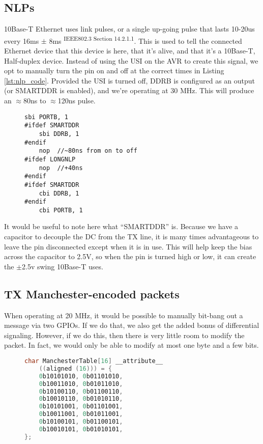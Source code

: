 \documentclass[13pt]{ltxdoc}
\begin{document}
\subsection{NLPs}
10Base-T Ethernet uses link pulses, or a single up-going pulse that lasts 10-20us
every 16ms $\pm$ 8ms \textsuperscript{IEEE802.3 Section 14.2.1.1}.  This is used to tell
the connected Ethernet device that this device is here, that it's alive, and that it's a
10Base-T, Half-duplex device.  Instead of using the USI on the AVR to create this
signal, we opt to manually turn the pin on and off at the correct times in
Listing \ref{lst:nlp_code}.  Provided the USI is turned off, DDRB is configured as
an output (or SMARTDDR is enabled), and we're operating at 30 MHz.  This will produce an $\approx$80ns to $\approx$120ns pulse.

\begin{figure}
\begin{lstlisting}[caption=NLP Code\label{lst:nlp_code}, frame=single]
	sbi PORTB, 1
#ifdef SMARTDDR
	sbi DDRB, 1
#endif
	nop  //~80ns from on to off
#ifdef LONGNLP 
	nop  //+40ns
#endif
#ifdef SMARTDDR
	cbi DDRB, 1
#endif
	cbi PORTB, 1
\end{lstlisting}
\end{figure}

It would be useful to note here what ``SMARTDDR'' is.  Because we have a capacitor to decouple the DC from the TX line,
it is many times advantageous to leave the pin disconnected except when it is in use.  This will help keep the bias
across the capacitor to 2.5V, so when the pin is turned high or low, it can create the $\pm$2.5v swing 10Base-T uses.

\subsection{TX Manchester-encoded packets}
When operating at 20 MHz, it would be possible to manually bit-bang out a message
via two GPIOs.  If we do that, we also get the added bonus of differential
signaling.  However, if we do this, then there is very little room to modify
the packet.  In fact, we would only be able to modify at most one byte and a
few bits.


\begin{figure}
\begin{lstlisting}[caption=Manchester Lookup Table\label{lst:mantable},language=C, frame=single]
char ManchesterTable[16] __attribute__
	((aligned (16))) = {
	0b10101010, 0b01101010,
	0b10011010, 0b01011010,
	0b10100110, 0b01100110,
	0b10010110, 0b01010110,
	0b10101001, 0b01101001,
	0b10011001, 0b01011001,
	0b10100101, 0b01100101,
	0b10010101, 0b01010101,
};
\end{lstlisting}
\end{figure}
\end{document}

